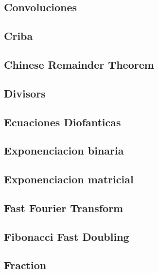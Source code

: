 \subsection{Convoluciones}
\raggedbottom
\hrulefill
\subsection{Criba}
\raggedbottom
\hrulefill
\subsection{Chinese Remainder Theorem}
\raggedbottom
\hrulefill
\subsection{Divisors}
\raggedbottom
\hrulefill
\subsection{Ecuaciones Diofanticas}
\raggedbottom
\hrulefill
\subsection{Exponenciacion binaria}
\raggedbottom
\hrulefill
\subsection{Exponenciacion matricial}
\raggedbottom
\hrulefill
\subsection{Fast Fourier Transform}
\raggedbottom
\hrulefill
\subsection{Fibonacci Fast Doubling}
\raggedbottom
\hrulefill
\subsection{Fraction}
\raggedbottom
\hrulefill
